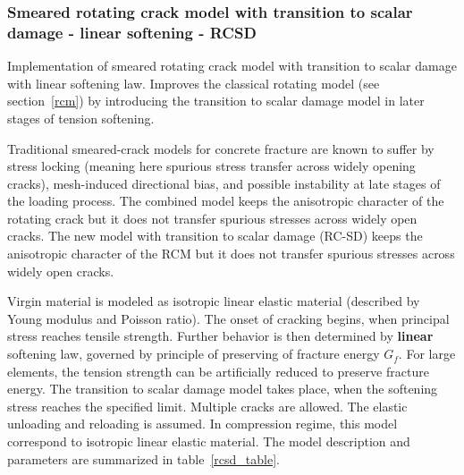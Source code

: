 \documentclass[a4paper]{article}
\begin{document}
\subsubsection{Smeared rotating crack model with transition to scalar
damage - linear softening - RCSD}
\label{rcsd}
Implementation of smeared rotating crack model with transition to
scalar damage with linear softening law.
Improves the classical rotating model (see
section~\ref{rcm}) by introducing the transition to scalar damage
model in  later stages of tension softening.

Traditional smeared-crack models for concrete fracture are known to suffer by stress locking (meaning here spurious stress transfer across widely opening cracks),
mesh-induced directional bias, and possible instability at late stages of the loading process.
The combined model keeps the anisotropic character of the rotating
crack but it does not transfer spurious stresses across
widely open cracks.
The new model with transition to
scalar damage (RC-SD) keeps the anisotropic character of the RCM but
it does not transfer spurious stresses across widely open cracks.

Virgin material is modeled as isotropic linear elastic material
(described by Young modulus and Poisson
ratio). The onset of cracking begins, when principal stress reaches
tensile strength.
Further behavior is then determined by {\bf linear} softening law,
governed by principle of preserving of fracture
energy $G_f$. For large elements, the tension strength can be
artificially reduced
to preserve fracture energy.  The transition to scalar damage model
takes place, when the softening stress reaches the specified limit.
Multiple cracks are allowed.
The elastic unloading and reloading is assumed.
In compression regime, this model correspond to isotropic linear elastic material.
The model description and parameters are summarized
in table~\ref{rcsd_table}.
\end{document}
